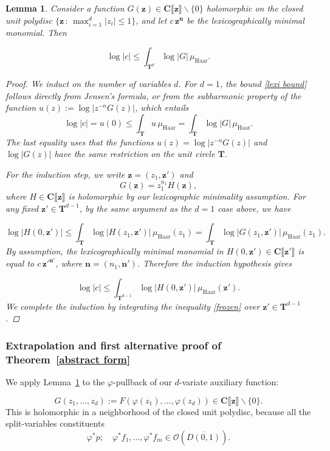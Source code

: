 \documentclass[10pt]{amsart}
\renewcommand\setminus{\smallsetminus}
\def\T{\mathbf{T}}
\renewcommand\mathbb{\mathbf}
\newtheorem{lemma}[subsubsection]{Lemma}
\theoremstyle{remark}
\numberwithin{equation}{subsection}
\def\numequation{\addtocounter{subsubsection}{1}\begin{equation}}
\def\C{\mathbf{C}}
\begin{document}
\begin{lemma}  \label{lowest lexi}
Consider a function $G(\mathbf{z}) \in \C \llbracket \mathbf{z} \rrbracket \setminus \{0\}$ holomorphic on the closed unit polydisc $\{\mathbf{z} \, : \, \max_{i=1}^d |z_i|\leq 1\}$, and let $c \, \mathbf{z^n}$ be the lexicographically minimal monomial. Then
\numequation \label{lexi bound}
 \log{|c|}   \leq  \int_{\T^d} \log{|G|} \, \mu_{\mathrm{Haar}}. 
\end{equation}

\begin{proof}
We induct on the number of variables $d$. For $d = 1$, the bound \eqref{lexi bound} follows directly from Jensen's formula, or from the subharmonic property of the function $u(z) := \log{|z^{-n}G(z)|}$, which entails
$$
\log{|c|}  = u(0)  \leq \int_{\T} u \, \mu_{\mathrm{Haar}}  = \int_{\T} \log{|G|} \, \mu_{\mathrm{Haar}}. 
$$ 
The last equality uses that the functions $u(z) = \log{|z^{-n}G(z)|}$ and $\log{|G(z)|}$ have the same restriction on the unit circle $\T$.

For the induction step, we write $\mathbf{z} = (z_1, \mathbf{z}')$ and
$$
G(\mathbf{z}) = z_1^{n_1} H(\mathbf{z}), 
$$
where $H \in \C\llbracket \mathbf{z} \rrbracket$ is holomorphic   by our lexicographic minimality assumption. For any fixed $\mathbf{z}' \in \T^{d-1}$, by the same argument as the $d=1$ case above, we have
\numequation \label{frozen}
\log{|H(0, \mathbf{z}')|} \leq \int_{\T} \log{|H(z_1, \mathbb{z}')|} \, \mu_{\mathrm{Haar}}(z_1) = \int_{\T} \log{|G(z_1, \mathbf{z}')|} \, \mu_{\mathrm{Haar}}(z_1).
\end{equation}
By assumption, the lexicographically minimal monomial in $H(0,\mathbf{z}') \in \C \llbracket \mathbf{z}' \rrbracket$ is equal to $c \, \mathbf{z}'^{\mathbf{n}'}$, where $\mathbf{n} = (n_1, \mathbf{n}')$. Therefore the induction hypothesis gives
\numequation
\log{|c|}  \leq \int_{\mathbf{T}^{d-1}} \log{| H(0, \mathbf{z}') |} \, \mu_{\mathrm{Haar}} (\mathbf{z}').
\end{equation}
We complete the induction by integrating the inequality \eqref{frozen} over $\mathbf{z}' \in \T^{d-1}$. 
\end{proof}
\end{lemma}


\subsubsection{Extrapolation and first alternative proof of Theorem~\ref{abstract form}}  \label{extrapolation part}
We apply Lemma~\ref{lowest lexi} to the $\varphi$-pullback of our $d$-variate auxiliary function: 
\numequation
G(z_1, \ldots, z_d) := F(  \varphi(z_1), \ldots, \varphi(z_d)  )  \in \C \llbracket \mathbf{z} 
\rrbracket \setminus \{0\}.
\end{equation}
This is holomorphic in a neighborhood of the closed unit polydisc, because all the split-variables constituents 
$$
\varphi^*p; \quad  \varphi^* f_1, \ldots, \varphi^* f_m \in {\mathcal{O}(\overline{D(0,1)})}.
$$
\end{document}
